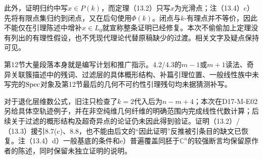 此外，证明归约中写$x\in P(k)$，而定理（13.2）只写$x$为光滑点；注（13.4）c）先将有限点集归约到闭点，又在后句使用$\Phi(k)$。闭点与$k$-有理点并不等价，因此不能仅在引理陈述中增补$x\in L_0$就宣称整条证明已经修复。本次不偷偷加上定理没有列出的有理性假设，也不凭现代理论代替原稿缺少的过渡。相关文字及疑点保持可见。

第12节大量段落本身就是编写计划和推广指示。4.2/4.3的$m-1$或$m+1$读法、奇异关联簇描述中的残词、过滤层的具体概形结构、补篇引理位置、一般线性族中未写完的$\operatorname{Spec}$对象及第12节最后的几何不可约性引理残句均未据猜测补写。

对于退化层维数公式，旧注只检查了$k=2$代入后为$n-m+4$；本次在D17-M-E02另给具体空轨迹例子，并在非空纯维几何纤维的明确范围内完成线性代数计算；后续关于过滤的概形结构及超奇异点的论证仍未因此得到验证。证明（13.2）/（13.3）援引8.7(c)、8.8，也不能由后文的“因此证明”反推被引条目的缺文已恢复。注（13.4）d）一般基底的条件和e）普遍覆盖同胚于$\mathbb C^n$的较强断言均保留原作者的陈述，同时保留未独立证明的说明。
